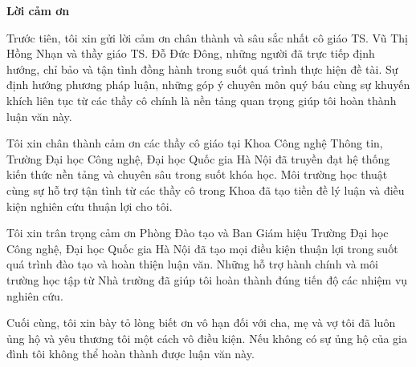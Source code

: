 \begin{center}
\textbf{\large{Lời cảm ơn}}
\end{center}


Trước tiên, tôi xin gửi lời cảm ơn chân thành và sâu sắc nhất cô giáo TS. Vũ Thị Hồng Nhạn và thầy giáo TS. Đỗ Đức Đông, những người đã trực tiếp định hướng, chỉ bảo và tận tình đồng hành trong suốt quá trình thực hiện đề tài. Sự định hướng phương pháp luận, những góp ý chuyên môn quý báu cùng sự khuyến khích liên tục từ các thầy cô chính là nền tảng quan trọng giúp tôi hoàn thành luận văn này.

Tôi xin chân thành cảm ơn các thầy cô giáo tại Khoa Công nghệ Thông tin, Trường Đại học Công nghệ, Đại học Quốc gia Hà Nội đã truyền đạt hệ thống kiến thức nền tảng và chuyên sâu trong suốt khóa học. Môi trường học thuật cùng sự hỗ trợ tận tình từ các thầy cô trong Khoa đã tạo tiền đề lý luận và điều kiện nghiên cứu thuận lợi cho tôi.

Tôi xin trân trọng cảm ơn Phòng Đào tạo và Ban Giám hiệu Trường Đại học Công nghệ, Đại học Quốc gia Hà Nội đã tạo mọi điều kiện thuận lợi trong suốt quá trình đào tạo và hoàn thiện luận văn. Những hỗ trợ hành chính và môi trường học tập từ Nhà trường đã giúp tôi hoàn thành đúng tiến độ các nhiệm vụ nghiên cứu.

Cuối cùng, tôi xin bày tỏ lòng biết ơn vô hạn đối với cha, mẹ và vợ tôi đã luôn ủng hộ và yêu thương tôi một cách vô điều kiện. Nếu không có sự ủng hộ của gia đình tôi không thể hoàn thành được luận văn này.
